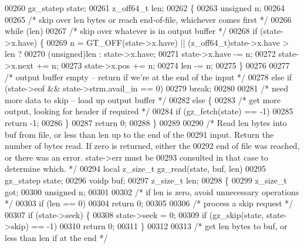 \begin{DoxyCode}
00260     gz\_statep state;
00261     z\_off64\_t len;
00262 \{
00263     \textcolor{keywordtype}{unsigned} n;
00264 
00265     \textcolor{comment}{/* skip over len bytes or reach end-of-file, whichever comes first */}
00266     \textcolor{keywordflow}{while} (len)
00267         \textcolor{comment}{/* skip over whatever is in output buffer */}
00268         \textcolor{keywordflow}{if} (state->x.have) \{
00269             n = GT\_OFF(state->x.have) || (z\_off64\_t)state->x.have > len ?
00270                 (\textcolor{keywordtype}{unsigned})len : state->x.have;
00271             state->x.have -= n;
00272             state->x.next += n;
00273             state->x.pos += n;
00274             len -= n;
00275         \}
00276 
00277         \textcolor{comment}{/* output buffer empty -- return if we're at the end of the input */}
00278         \textcolor{keywordflow}{else} \textcolor{keywordflow}{if} (state->eof && state->strm.avail\_in == 0)
00279             \textcolor{keywordflow}{break};
00280 
00281         \textcolor{comment}{/* need more data to skip -- load up output buffer */}
00282         \textcolor{keywordflow}{else} \{
00283             \textcolor{comment}{/* get more output, looking for header if required */}
00284             \textcolor{keywordflow}{if} (gz\_fetch(state) == -1)
00285                 \textcolor{keywordflow}{return} -1;
00286         \}
00287     \textcolor{keywordflow}{return} 0;
00288 \}
00289 
00290 \textcolor{comment}{/* Read len bytes into buf from file, or less than len up to the end of the}
00291 \textcolor{comment}{   input.  Return the number of bytes read.  If zero is returned, either the}
00292 \textcolor{comment}{   end of file was reached, or there was an error.  state->err must be}
00293 \textcolor{comment}{   consulted in that case to determine which. */}
00294 local z\_size\_t gz\_read(state, buf, len)
00295     gz\_statep state;
00296     voidp buf;
00297     z\_size\_t len;
00298 \{
00299     z\_size\_t got;
00300     \textcolor{keywordtype}{unsigned} n;
00301 
00302     \textcolor{comment}{/* if len is zero, avoid unnecessary operations */}
00303     \textcolor{keywordflow}{if} (len == 0)
00304         \textcolor{keywordflow}{return} 0;
00305 
00306     \textcolor{comment}{/* process a skip request */}
00307     \textcolor{keywordflow}{if} (state->seek) \{
00308         state->seek = 0;
00309         \textcolor{keywordflow}{if} (gz\_skip(state, state->skip) == -1)
00310             \textcolor{keywordflow}{return} 0;
00311     \}
00312 
00313     \textcolor{comment}{/* get len bytes to buf, or less than len if at the end */}

\end{DoxyCode}
